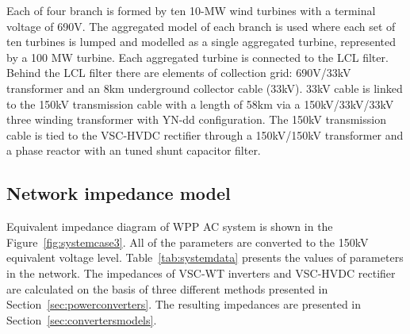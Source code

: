 \documentclass[12pt]{report} %
\begin{document}
Each of four branch is formed by ten 10-MW wind turbines with a terminal voltage of 690V. The aggregated model of each branch is used where each set of ten turbines is lumped and modelled as a single aggregated turbine, represented by a 100 MW turbine. Each aggregated turbine is connected to the LCL filter. Behind the LCL filter there are elements of collection grid: 690V/33kV transformer and an 8km underground collector cable (33kV). 33kV cable is linked to the 150kV transmission cable with a length of 58km via a 150kV/33kV/33kV three winding transformer with YN-dd configuration. The 150kV transmission cable is tied to the VSC-HVDC rectifier through a 150kV/150kV transformer and a phase reactor with an tuned shunt capacitor filter.

\subsection{Network impedance model}
Equivalent impedance diagram of WPP AC system is shown in the Figure~\ref{fig:systemcase3}. All of the parameters are converted to the 150kV equivalent voltage level. Table~\ref{tab:systemdata} presents the values of parameters in the network. The impedances of VSC-WT inverters and VSC-HVDC rectifier are calculated on the basis of three different methods presented in Section~\ref{sec:powerconverters}. The resulting impedances are presented in Section~\ref{sec:convertersmodels}.
\end{document}
